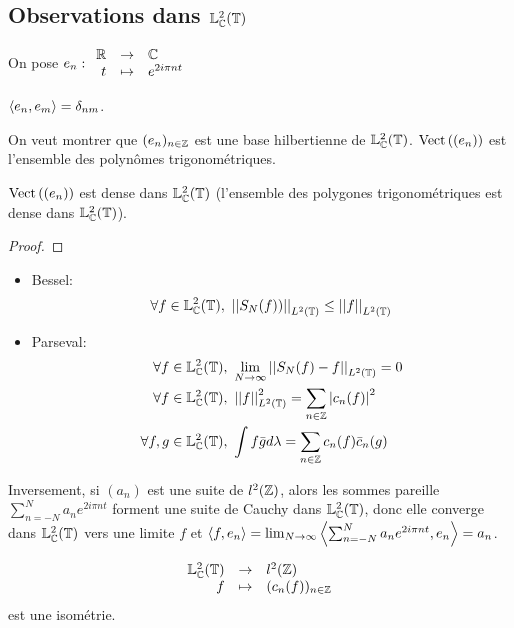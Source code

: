 \subsection{Observations dans $\mathbb{L}^2_{\mathbb{C}}(\mathbb{T})$}


On pose $e_n : \begin{array}{rcl}
		\mathbb{R} & \to     & \mathbb{C}           \\
		t  & \mapsto & e^{2i\pi nt}
	\end{array}$

$\left\langle e_n, e_m \right\rangle = \delta_{nm}$.

On veut montrer que $(e_n)_{n\in \mathbb{Z}}$ est une base hilbertienne de $\mathbb{L}^2_{\mathbb{C}}(\mathbb{T})$.
$\text{Vect}\left( (e_n) \right)$ est l'ensemble  des polynômes trigonométriques.


\begin{theorem}
	$\text{Vect}\left( (e_n) \right)$ est dense dans $\mathbb{L}^2_{\mathbb{C}}(\mathbb{T})$ (l'ensemble des polygones trigonométriques est dense dans $\mathbb{L}^2_{\mathbb{C}}(\mathbb{T})$).
\end{theorem}

\begin{proof}
\end{proof}


\begin{coro}[Conséquences]

	\begin{itemize}
		\item Bessel: $$\forall f \in \mathbb{L}^2_{\mathbb{C}}(\mathbb{T}), \ \left|\left|S_N(f))\right|\right|_{L^2(\mathbb{T})} \leq \left|\left|f\right|\right|_{L^2(\mathbb{T})}$$
		\item Parseval:
		      \begin{eqnarray*}
			      \forall f \in \mathbb{L}^2_{\mathbb{C}}(\mathbb{T}),& \ \lim_{N\to \infty} \left|\left|S_N(f) - f\right|\right|_{L^2(\mathbb{T})} = 0 \\
			      \forall f \in \mathbb{L}^2_{\mathbb{C}}(\mathbb{T}),& \ \left|\left|f\right|\right|_{L^2(\mathbb{T})}^2 = \sum_{n\in \mathbb{Z}} \left|c_n(f)\right|^2 \\
			      \forall f, g \in \mathbb{L}^2_{\mathbb{C}}(\mathbb{T}),& \ \int f\bar g d \lambda = \sum_{n\in \mathbb{Z}} c_n(f) \bar c_n(g)
		      \end{eqnarray*}
	\end{itemize}

	Inversement, si $(a_n)$ est une suite de $l^2(\mathbb{Z})$, alors les sommes pareille $\sum_{n=-N}^N a_n e^{2i\pi nt}$ forment
	une suite de Cauchy dans $\mathbb{L}^2_{\mathbb{C}}(\mathbb{T})$, donc elle converge dans $\mathbb{L}^2_{\mathbb{C}}(\mathbb{T})$ vers une limite $f$ et
	$\left\langle f, e_n \right\rangle = \lim_{N\to \infty} \left\langle \sum_{n=-N}^N a_n e^{2i\pi nt}, e_n \right\rangle = a_n$.
\end{coro}


\begin{theorem}
	$$\begin{array}{rcl}
			\mathbb{L}^2_{\mathbb{C}}(\mathbb{T}) & \to     & l^2(\mathbb{Z})            \\
			f            & \mapsto & (c_n(f))_{n\in \mathbb{Z}}
		\end{array}$$ est une isométrie.
\end{theorem}
